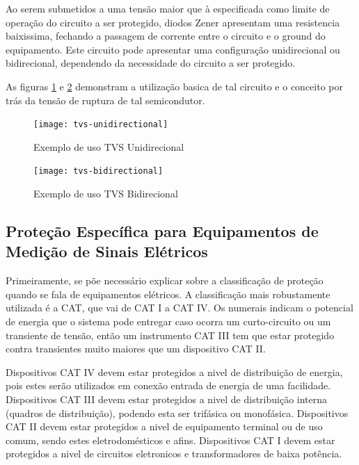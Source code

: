     Ao serem submetidos a uma tensão maior que à especificada como limite de operação do circuito a ser protegido, diodos Zener apresentam uma resistencia baixissima, fechando a passagem de corrente entre o circuito e o ground do equipamento. Este circuito pode apresentar uma configuração unidirecional ou bidirecional, dependendo da necessidade do circuito a ser protegido. 
    
    As figuras \ref{fig:tvsUnidirecional} e \ref{fig:tvsBidirecional} demonstram a utilização basica de tal circuito e o conceito por trás da tensão de ruptura de tal semicondutor.

    \begin{figure}[htb]%
        \caption{Exemplo de uso TVS Unidirecional}%
        \label{fig:tvsUnidirecional}%
        \texttt{[image: tvs-unidirectional]}%
    \end{figure}

    \begin{figure}[htb]%
        \caption{Exemplo de uso TVS Bidirecional}%
        \label{fig:tvsBidirecional}%
        \texttt{[image: tvs-bidirectional]}%
    \end{figure}

    \subsection{Proteção Específica para Equipamentos de Medição de Sinais Elétricos}\label{subsec:especProtec}

    Primeiramente, se põe necessário explicar sobre a classificação de proteção quando se fala de equipamentos elétricos. A classificação mais robustamente utilizada é a CAT, que vai de CAT I a CAT IV. Os numerais indicam o potencial de energia que o sistema pode entregar caso ocorra um curto-circuito ou um transiente de tensão, então um instrumento CAT III tem que estar protegido contra transientes muito maiores que um dispositivo CAT II. 

    Dispositivos CAT IV devem estar protegidos a nivel de distribuição de energia, pois estes serão utilizados em conexão entrada de energia de uma facilidade. Dispositivos CAT III devem estar protegidos a nivel de distribuição interna (quadros de distribuição), podendo esta ser trifásica ou monofásica. Dispositivos CAT II devem estar protegidos a nivel de equipamento terminal ou de uso comum, sendo estes eletrodomésticos e afins. Dispositivos CAT I devem estar protegidos a nivel de circuitos eletronicos e transformadores de baixa potência. %

